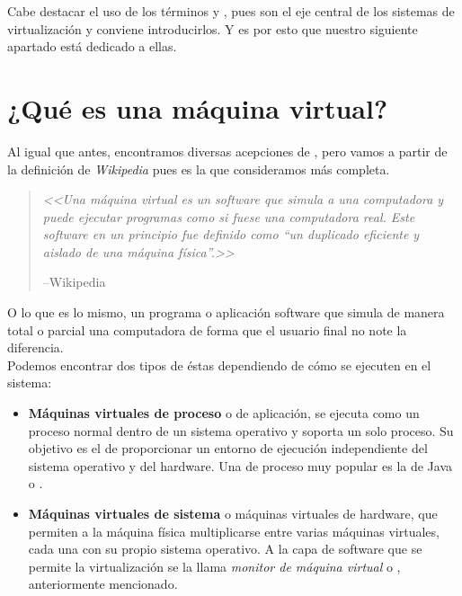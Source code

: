 Cabe destacar el uso de los términos \emph{} y , pues son el eje central de los sistemas de virtualización y conviene introducirlos. Y es por esto que nuestro siguiente apartado está dedicado a ellas.

\section{¿Qué es una máquina virtual?}

Al igual que antes, encontramos diversas acepciones de \emph{}, pero vamos a partir de la definición de \emph{Wikipedia} pues es la que consideramos más completa.

\begin{quote}
\emph{<<Una máquina virtual es un software que simula a una computadora y puede ejecutar programas como si fuese una computadora real. Este software en un principio fue definido como \textquotedblleft un duplicado eficiente y aislado de una máquina física\textquotedblright.>>}
\begin{flushright}
--Wikipedia\cite{defmaqvirwiki}
\end{flushright}
\end{quote}

O lo que es lo mismo, un programa o aplicación software que simula de manera total o parcial una computadora de forma que el usuario final no note la diferencia.\\

Podemos encontrar dos tipos de éstas dependiendo de cómo se ejecuten en el sistema:

\begin{itemize}
\item \textbf{Máquinas virtuales de proceso} o  de aplicación, se ejecuta como un proceso normal dentro de un sistema operativo y soporta un solo proceso. Su objetivo es el de proporcionar un entorno de ejecución independiente del sistema operativo y del hardware. Una  de proceso muy popular es la de Java o \emph{}.
\item \textbf{Máquinas virtuales de sistema} o máquinas virtuales de hardware, que permiten a la máquina física multiplicarse entre varias máquinas virtuales, cada una con su propio sistema operativo. A la capa de software que se permite la virtualización se la llama \emph{monitor de máquina virtual} o , anteriormente mencionado.
\end{itemize}

